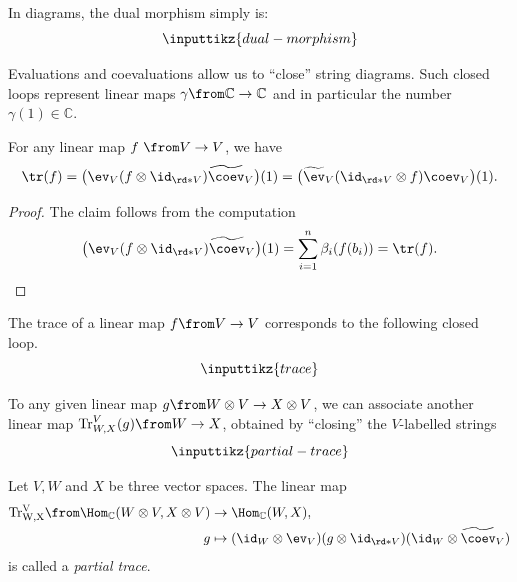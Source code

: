 \documentclass[a4paper,oneside, 12pt]{amsart}
\begin{document}
In diagrams, the dual morphism simply is:
\begin{equation*}
  \inputtikz{dual-morphism}
\end{equation*}


Evaluations and coevaluations allow us to  ``close'' string diagrams.
Such closed loops represent linear maps \( \gamma \from \mathbb{C} \to \mathbb{C}\) and in particular the number \(\gamma(1) \in \mathbb{C}\).


\begin{proposition}\label{prop:traces}
  For any linear map \(f\ \from V\to V\), we have
  \begin{equation}
    \tr(f)
    = \big(\ev_{V} (f\otimes \id_{\rd*{V}}) \widetilde{\coev}_{V}\big)(1)
    = \big(\widetilde{\ev}_{V} (\id_{\rd*{V}}\otimes f) \coev_{V}\big)(1).
  \end{equation}
\end{proposition}
\begin{proof}
  The claim follows from the computation
  \begin{equation*}
   \big(\ev_{V} (f\otimes \id_{\rd*{V}}) \widetilde{\coev}_{V}\big)(1) =  \sum_{i=1}^{n} \beta_{i}(f(b_{i})) = \tr(f). \qedhere
  \end{equation*}
\end{proof}

The trace of a linear map \(f \from V\to V \) corresponds to the following closed loop.
\begin{equation*}
  \inputtikz{trace}
\end{equation*}

To any given linear map \(g \from W\otimes V \to X\otimes V\), we can associate another linear map
\(\mathrm{Tr}_{W,X}^{V}(g) \from W\to X\), obtained by ``closing'' the \(V\)-labelled strings
\begin{equation*}
  \inputtikz{partial-trace}
\end{equation*}

\begin{definition}\label{def:partial-trace}
  Let \(V,W\) and \(X\) be three vector spaces.
  The linear map
  \begin{equation}
    \begin{aligned}
      \mathrm{Tr^{V}_{W,X}} \from \Hom_{ \mathbb{C}}(W\otimes V, X \otimes V) &\to \Hom_{ \mathbb{C}}(W, X), \\
      g &\mapsto (\id_{W} \otimes \ev_{V}) (g\otimes \id_{\rd*{V}}) (\id_{W}\otimes \widetilde{\coev}_{V})
    \end{aligned}
  \end{equation}
  is called a \emph{partial trace}.
\end{definition}
\end{document}
